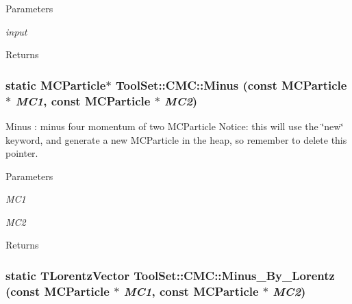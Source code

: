 \begin{DoxyParams}{Parameters}
\item[{\em input}]\end{DoxyParams}
\begin{DoxyReturn}{Returns}

\end{DoxyReturn}
\hypertarget{classToolSet_1_1CMC_aa597db31bacbc37cbc16da5bfe2b1d9a}{
\subsubsection[{Minus}]{\setlength{\rightskip}{0pt plus 5cm}static MCParticle$\ast$ ToolSet::CMC::Minus (const MCParticle $\ast$ {\em MC1}, \/  const MCParticle $\ast$ {\em MC2})}}
\label{classToolSet_1_1CMC_aa597db31bacbc37cbc16da5bfe2b1d9a}


Minus : minus four momentum of two MCParticle Notice: this will use the \char`\"{}new\char`\"{} keyword, and generate a new MCParticle in the heap, so remember to delete this pointer. 
\begin{DoxyParams}{Parameters}
\item[{\em MC1}]\item[{\em MC2}]\end{DoxyParams}
\begin{DoxyReturn}{Returns}

\end{DoxyReturn}
\hypertarget{classToolSet_1_1CMC_a5883ceda367cc5e32cbacdabdc119a4a}{
\subsubsection[{Minus\_\-By\_\-Lorentz}]{\setlength{\rightskip}{0pt plus 5cm}static TLorentzVector ToolSet::CMC::Minus\_\-By\_\-Lorentz (const MCParticle $\ast$ {\em MC1}, \/  const MCParticle $\ast$ {\em MC2})}}
\label{classToolSet_1_1CMC_a5883ceda367cc5e32cbacdabdc119a4a}


